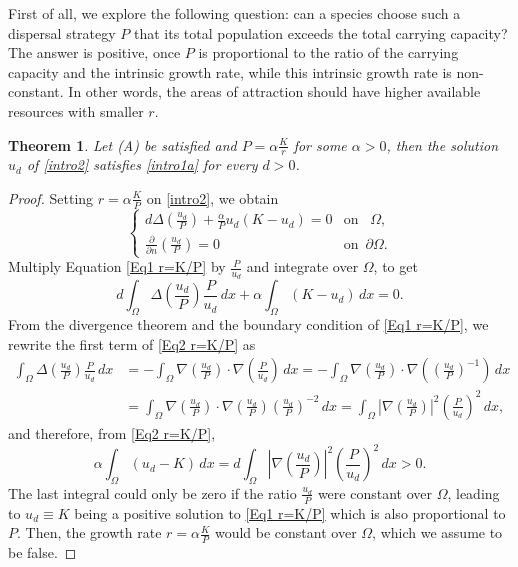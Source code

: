 \documentclass[11pt]{article}
\newcommand{\parentheses}[1]{\left(#1\right)}
\newcommand{\module}[1]{\left|#1\right|}
\newtheorem{theorem}[statement]{Theorem}
\theoremstyle{definition}
\theoremstyle{remark}
\begin{document}
First of all, we explore the following question: can a species choose such a dispersal strategy $P$ that its total population exceeds the total carrying capacity?
The answer is positive, once $P$ is proportional to the ratio of the carrying capacity and the intrinsic growth rate, while this intrinsic growth rate is non-constant. In other words, the areas of attraction should have higher
available resources with smaller $r$.


\begin{theorem}
\label{Lou_generalize}
Let (A) be satisfied and $\displaystyle P = \alpha \frac{K}{r}$ for some $\alpha >0$, then the solution $u_d$ of \eqref{intro2} satisfies \eqref{intro1a} for every $d>0$.
\end{theorem}

\begin{proof}
    Setting $r=\alpha\frac{K}{P}$ on \eqref{intro2}, we obtain
    \begin{equation}\label{Eq1 r=K/P}
    \begin{cases}
        d\Delta\parentheses{\frac{u_d}{P}}+\frac{\alpha}{P}u_d\parentheses{K-u_d}=0 & \mbox {on }  \,\,\,\Omega, \\
        \frac{\partial}{\partial n}\parentheses{\frac{u_d}{P}}=0  & \mbox {on } \,\partial\Omega.
    \end{cases} 
\end{equation}
    Multiply Equation \eqref{Eq1 r=K/P} by $\frac{P}{u_d}$ and integrate over $\Omega$, to get
	\begin{equation}\label{Eq2 r=K/P}
		d\int_\Omega\Delta\parentheses{\frac{u_d}{P}}\frac{P}{u_d}\,dx+\alpha\int_\Omega(K-u_d)\,dx=0.
	\end{equation}
From the divergence theorem and the boundary condition of \eqref{Eq1 r=K/P}, we rewrite the first term of \eqref{Eq2 r=K/P} as
\begin{align*}
    \int_\Omega\Delta\parentheses{\frac{u_d}{P}}\frac{P}{u_d}\,dx&=-\int_\Omega \nabla\parentheses{\frac{u_d}{P}}\cdot\nabla\parentheses{\frac{P}{u_d}}\,dx=-\int_\Omega \nabla\parentheses{\frac{u_d}{P}}\cdot\nabla\parentheses{\parentheses{\frac{u_d}{P}}^{-1}}\,dx\\
    &=\int_\Omega\nabla\parentheses{\frac{u_d}{P}}\cdot\nabla\parentheses{\frac{u_d}{P}}\parentheses{\frac{u_d}{P}}^{-2}\,dx=\int_\Omega \module{\nabla\parentheses{\frac{u_d}{P}}}^2\parentheses{\frac{P}{u_d}}^2\,dx,
\end{align*}
and therefore, from \eqref{Eq2 r=K/P},
\begin{equation*}
    \alpha\int_\Omega(u_d-K)\,dx=d\int_\Omega \module{\nabla\parentheses{\frac{u_d}{P}}}^2\parentheses{\frac{P}{u_d}}^2\,dx>0.
\end{equation*}
The last integral could only be zero if the  ratio $\frac{u_d}{P}$ were constant over $\Omega$, leading to $u_d \equiv K$ being a positive solution to \eqref{Eq1 r=K/P} which is also proportional to $P$.
Then,  the growth rate $r=\alpha\frac{K}{P}$ would be constant over $\Omega$, which we assume to be false.
\end{proof}
\end{document}
